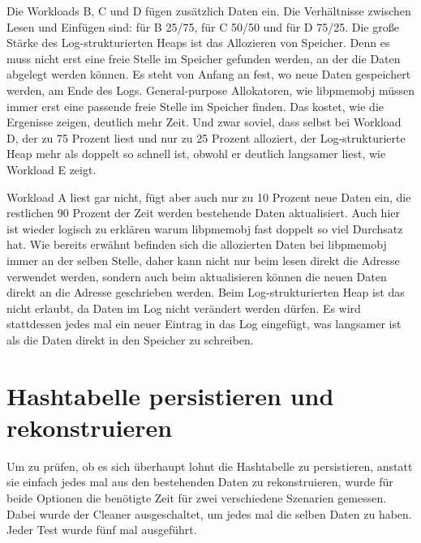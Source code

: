 \documentclass{class/thesis}
\begin{document}
\begin{thesis}
	Die Workloads B, C und D fügen zusätzlich Daten ein. Die Verhältnisse zwischen Lesen und Einfügen sind: für B 25/75, für C 50/50 und für D 75/25.
	Die große Stärke des Log-strukturierten Heaps ist das Allozieren von Speicher. Denn es muss nicht erst eine freie Stelle im Speicher gefunden werden, an der die Daten abgelegt werden können.
	Es steht von Anfang an fest, wo neue Daten gespeichert werden, am Ende des Logs. 
	General-purpose Allokatoren, wie libpmemobj müssen immer erst eine passende freie Stelle im Speicher finden.
	Das kostet, wie die Ergenisse zeigen, deutlich mehr Zeit. Und zwar soviel, dass selbst bei Workload D, der zu 75 Prozent liest und nur zu 25 Prozent alloziert, der Log-strukturierte Heap mehr als doppelt so schnell ist, obwohl er deutlich langsamer liest, wie Workload E zeigt.
	
	Workload A liest gar nicht, fügt aber auch nur zu 10 Prozent neue Daten ein, die restlichen 90 Prozent der Zeit werden bestehende Daten aktualisiert. Auch hier ist wieder logisch zu erklären warum libpmemobj fast doppelt so viel Durchsatz hat.
	Wie bereits erwähnt befinden sich die allozierten Daten bei libpmemobj immer an der selben Stelle, daher kann nicht nur beim lesen direkt die Adresse verwendet werden, sondern auch beim aktualisieren können die neuen Daten direkt an die Adresse geschrieben werden.
	Beim Log-strukturierten Heap ist das nicht erlaubt, da Daten im Log nicht verändert werden dürfen.
	Es wird stattdessen jedes mal ein neuer Eintrag in das Log eingefügt, was langsamer ist als die Daten direkt in den Speicher zu schreiben.
	
	
	
	\section{Hashtabelle persistieren und rekonstruieren}
	
	Um zu prüfen, ob es sich überhaupt lohnt die Hashtabelle zu persistieren, anstatt sie einfach jedes mal aus den bestehenden Daten zu rekonstruieren, wurde für beide Optionen die benötigte Zeit für zwei verschiedene Szenarien gemessen. 
	Dabei wurde der Cleaner ausgeschaltet, um jedes mal die selben Daten zu haben. 
	Jeder Test wurde fünf mal ausgeführt.


\end{thesis}
\end{document}
